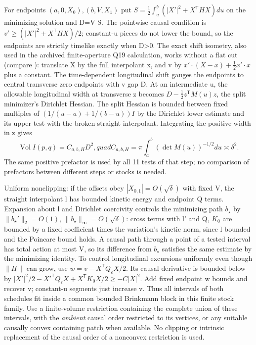 \documentclass[11pt]{article}
\begin{document}
For endpoints \((a,0,X_0),(b,V,X_1)\) put \(S=\frac12\int_a^b(|X'|^2+X^{\mathsf T}HX)du\) on the minimizing solution and D=V-S. The pointwise causal condition is \(v'\ge (|X'|^2+X^{\mathsf T}HX)/2\); constant-u pieces do not lower the bound, so the endpoints are strictly timelike exactly when D\textgreater0. The exact shift isometry, also used in the archived finite-aperture Q19 calculation, works without a flat cut (compare \cite{harte}): translate X by the full interpolant x, and v by \(x'\cdot (X-x)+\frac12 x'\cdot x\) plus a constant. The time-dependent longitudinal shift gauges the endpoints to central transverse zero endpoints with v gap D. At an intermediate u, the allowable longitudinal width at transverse z becomes \(D-\frac12z^{\mathsf T}M(u)z\), the split minimizer's Dirichlet Hessian. The split Hessian is bounded between fixed multiples of \((1/(u-a)+1/(b-u))I\) by the Dirichlet lower estimate and its upper test with the broken straight interpolant. Integrating the positive width in z gives
\[
 \operatorname{Vol}I(p,q)=C_{a,b,H}D^2,quad
 C_{a,b,H}=\pi\int_a^b (\det M(u))^{-1/2}du\asymp\delta^2 .
\]
The same positive prefactor is used by all 11 tests of that step; no comparison of prefactors between different steps or stocks is needed.

Uniform nonclipping: if the offsets obey \(|X_{0,1}|=O(\sqrt\delta)\) with fixed V, the straight interpolant l has bounded kinetic energy and endpoint Q terms. Expansion about l and Dirichlet coercivity controls the minimizing path \(b_\star\) by \(\|b_\star'\|_2=O(1)\), \(\|b_\star\|_\infty=O(\sqrt\delta)\): cross terms with l' and Q, \(K_0\) are bounded by a fixed coefficient times the variation's kinetic norm, since l bounded and the Poincare bound holds. A causal path through a point of a tested interval has total action at most V, so its difference from \(b_\star\) satisfies the same estimate by the minimizing identity. To control longitudinal excursions uniformly even though \(\|H\|\) can grow, use \(w=v-X^{\mathsf T}Q_\varepsilon X/2\). Its causal derivative is bounded below by \(|X'|^2/2-X'^{\mathsf T}Q_\varepsilon X+X^{\mathsf T}K_0 X/2\ge -C|X|^2\). Add fixed endpoint w bounds and recover v; constant-u segments just increase v. Thus all intervals of both schedules fit inside a common bounded Brinkmann block in this finite stock family. Use a finite-volume restriction containing the complete union of these intervals, with the \emph{ambient} causal order restricted to its vertices, or any suitable causally convex containing patch when available. No clipping or intrinsic replacement of the causal order of a nonconvex restriction is used.
\end{document}
